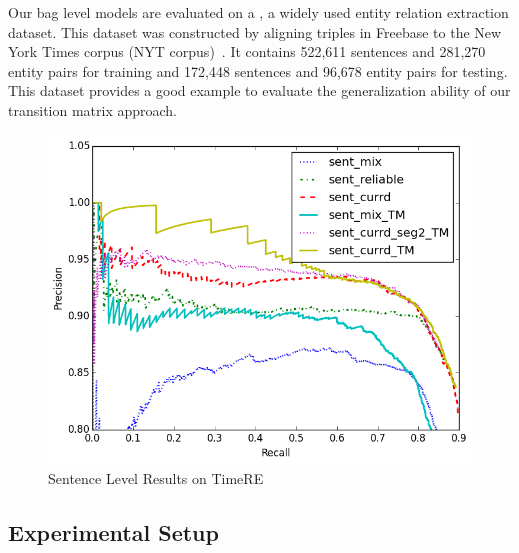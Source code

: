 Our bag level models are evaluated on a \EntityRE, a widely used entity
relation extraction dataset. This dataset was constructed by aligning triples
in Freebase to the New York Times corpus (NYT
corpus)~\cite{riedel2010modeling}. It contains 522,611 sentences and 281,270
entity pairs for training and  172,448 sentences and 96,678 entity pairs for
testing. This dataset provides a good example to evaluate the generalization
ability of our transition matrix approach. 


\begin{figure}[t!]
\begin{center}
\includegraphics[width=0.9\linewidth]{figures/sent_time_exp_overall.png}
\caption{Sentence Level Results on TimeRE}
\label{fig: sent_luo}
\end{center}
\end{figure}

\subsection{Experimental Setup}

